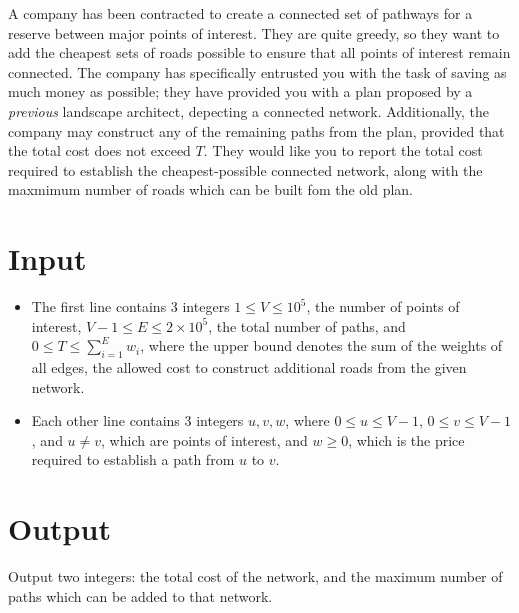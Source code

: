 A company has been contracted to create a connected set of pathways for a reserve between major points of interest. They are quite greedy, so they want to add the cheapest sets of roads possible to ensure that all points of interest remain connected. The company has specifically entrusted you with the task of saving as much money as possible; they have provided you with a plan proposed by a \textit{previous} landscape architect, depecting a connected network. Additionally, the company may construct any of the remaining paths from the plan, provided that the total cost does not exceed $T$. They would like you to report the total cost required to establish the cheapest-possible connected network, along with the maxmimum number of roads which can be built fom the old plan.

\section*{Input}
\begin{itemize}
    \item The first line contains 3 integers $1 \leq V \leq 10^5$, the number of points of interest, $V-1 \leq E \leq 2 \times 10^5$, the total number of paths, and $0 \leq T \leq \sum_{i=1}^{E} w_{i}$, where the upper bound denotes the sum of the weights of all edges, the allowed cost to construct additional roads from the given network.
    \item Each other line contains 3 integers $u, v, w$, where $0 \leq u \leq V - 1$, $0 \leq v \leq V - 1$, and $u \neq v$, which are points of interest, and $w \geq 0$, which is the price required to establish a path from $u$ to $v$.
\end{itemize}

\section*{Output}
Output two integers: the total cost of the network, and the maximum number of paths which can be added to that network.